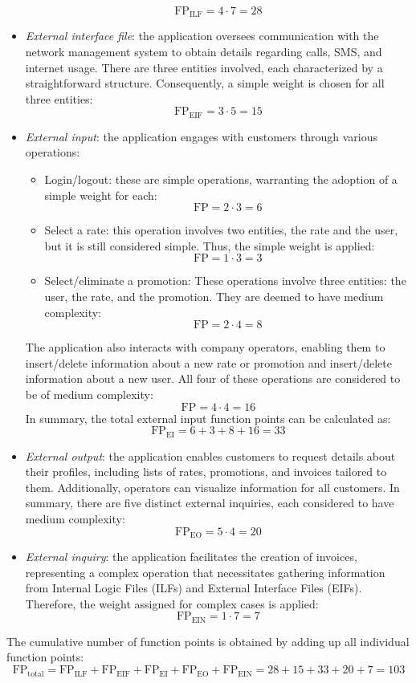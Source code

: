 \begin{example}
\begin{itemize}
            \[\text{FP}_{\text{ILF}}=4 \cdot 7=28\]
        \item \textit{External interface file}: the application oversees communication with the network management system to obtain details regarding calls, SMS, and internet usage.
            There are three entities involved, each characterized by a straightforward structure.
            Consequently, a simple weight is chosen for all three entities:
            \[\text{FP}_{\text{EIF}}=3 \cdot 5=15\]
        \item \textit{External input}: the application engages with customers through various operations:
            \begin{itemize}
                \item Login/logout: these are simple operations, warranting the adoption of a simple weight for each:
                    \[\text{FP}=2 \cdot 3=6\]
                \item Select a rate: this operation involves two entities, the rate and the user, but it is still considered simple. 
                    Thus, the simple weight is applied:
                    \[\text{FP}=1 \cdot 3=3\]
                \item Select/eliminate a promotion: These operations involve three entities: the user, the rate, and the promotion. 
                    They are deemed to have medium complexity:
                    \[\text{FP}=2 \cdot 4=8\]
            \end{itemize}
            The application also interacts with company operators, enabling them to insert/delete information about a new rate or promotion and insert/delete information about a new user. 
            All four of these operations are considered to be of medium complexity:
            \[\text{FP}=4 \cdot 4=16\]
            In summary, the total external input function points can be calculated as:
            \[\text{FP}_{\text{EI}}=6+3+8+16=33\]
        \item \textit{External output}: the application enables customers to request details about their profiles, including lists of rates, promotions, and invoices tailored to them.
            Additionally, operators can visualize information for all customers. 
            In summary, there are five distinct external inquiries, each considered to have medium complexity:
            \[\text{FP}_{\text{EO}}=5 \cdot 4 = 20\]
        \item \textit{External inquiry}: the application facilitates the creation of invoices, representing a complex operation that necessitates gathering information from Internal Logic Files (ILFs) and External Interface Files (EIFs). 
            Therefore, the weight assigned for complex cases is applied:
            \[\text{FP}_{\text{EIN}}=1 \cdot 7 = 7\]
    \end{itemize}
    The cumulative number of function points is obtained by adding up all individual function points:
    \[\text{FP}_{\text{total}}=\text{FP}_{\text{ILF}}+\text{FP}_{\text{EIF}}+\text{FP}_{\text{EI}}+\text{FP}_{\text{EO}}+\text{FP}_{\text{EIN}}=28+15+33+20+7=103\]
\end{example}

